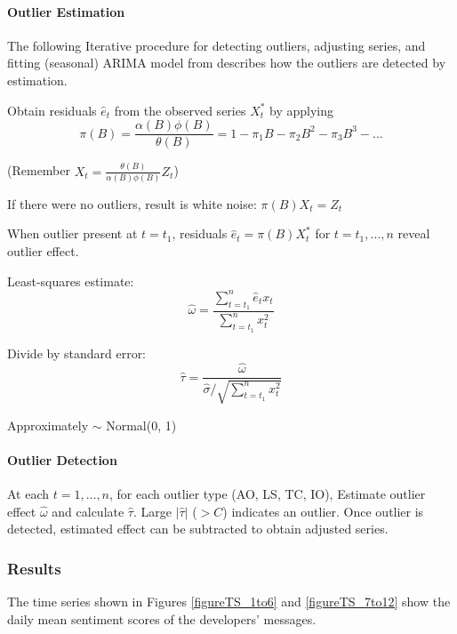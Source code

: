 \documentclass[12pt]{report}
\begin{document}
\paragraph{Outlier Estimation} 

The following Iterative procedure for detecting outliers, adjusting series,
and fitting (seasonal) ARIMA model from \cite{Chen} describes how the outliers are detected by estimation. 

Obtain residuals $\hat{e}_t$ from the observed series $X^*_t$ by applying
\begin{equation*}
\pi(B) = \frac{\alpha(B) \phi(B)}{\theta(B)} = 1 - \pi_1B - \pi_2B^2 - \pi_3B^3 - ...
\end{equation*}

(Remember $X_t = \frac{\theta(B)}{\alpha(B) \phi(B)} Z_t$)

If there were no outliers, result is white noise: $\pi(B) X_t = Z_t$

When outlier present at $t = t_1$, residuals $\hat{e}_t = \pi(B) X^*_t$ for $t = t_1, \dots, n$ reveal outlier effect.

Least-squares estimate:
\begin{equation*}
\hat{\omega} = \frac{\sum_{t = t_1}^{n} \hat{e}_t x_{t}}{\sum_{t = t_1}^{n} x^2_{t}}
\end{equation*}

Divide by standard error:
\begin{equation*}
\hat{\tau} = \frac{\hat{\omega}}{\hat{\sigma} / \sqrt{\sum_{t = t_1}^{n} x^2_t}}
\end{equation*}

Approximately $\sim$ Normal(0, 1)

\paragraph{Outlier Detection}

At each $t = 1, \dots, n$, for each outlier type (AO, LS, TC, IO), Estimate outlier effect $\hat{\omega}$ and calculate $\hat{\tau}$. Large $|\hat{\tau}|$ ($> C$) indicates an outlier. Once outlier is detected, estimated effect can be subtracted to obtain adjusted series.\cite{Chen}

\subsubsection{Results}

The time series shown in Figures \ref{figureTS_1to6} and \ref{figureTS_7to12} show the daily mean sentiment scores of the developers' messages.
\end{document}
